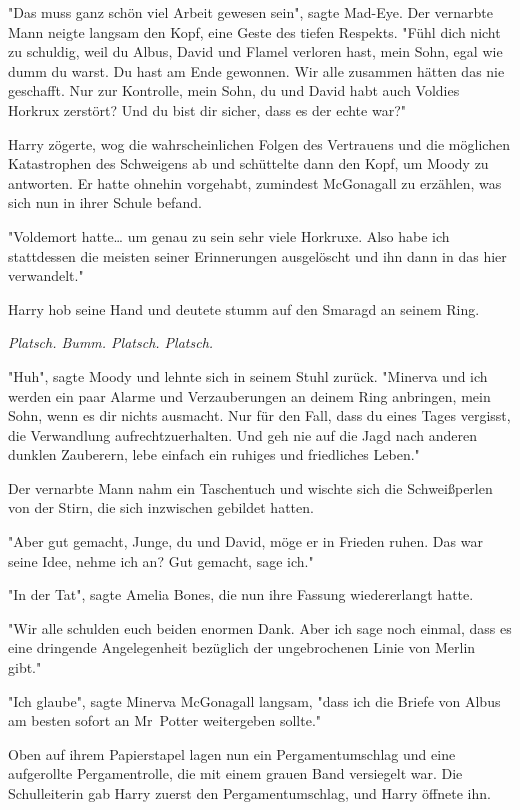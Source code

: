 {"Das muss ganz schön viel Arbeit gewesen sein", sagte Mad-Eye. Der vernarbte Mann neigte langsam den Kopf, eine Geste des tiefen Respekts. "Fühl dich nicht zu schuldig, weil du Albus, David und Flamel verloren hast, mein Sohn, egal wie dumm du warst. Du hast am Ende gewonnen. Wir alle zusammen hätten das nie geschafft. Nur zur Kontrolle, mein Sohn, du und David habt auch Voldies Horkrux zerstört? Und du bist dir sicher, dass es der echte war?"

Harry zögerte, wog die wahrscheinlichen Folgen des Vertrauens und die möglichen Katastrophen des Schweigens ab und schüttelte dann den Kopf, um Moody zu antworten. Er hatte ohnehin vorgehabt, zumindest McGonagall zu erzählen, was sich nun in ihrer Schule befand.

"Voldemort hatte… um genau zu sein sehr viele Horkruxe. Also habe ich stattdessen die meisten seiner Erinnerungen ausgelöscht und ihn dann in das hier verwandelt."

Harry hob seine Hand und deutete stumm auf den Smaragd an seinem Ring.

\emph{Platsch. Bumm. Platsch. Platsch.}

"Huh", sagte Moody und lehnte sich in seinem Stuhl zurück. "Minerva und ich werden ein paar Alarme und Verzauberungen an deinem Ring anbringen, mein Sohn, wenn es dir nichts ausmacht. Nur für den Fall, dass du eines Tages vergisst, die Verwandlung aufrechtzuerhalten. Und geh nie auf die Jagd nach anderen dunklen Zauberern, lebe einfach ein ruhiges und friedliches Leben."

Der vernarbte Mann nahm ein Taschentuch und wischte sich die Schweißperlen von der Stirn, die sich inzwischen gebildet hatten.

"Aber gut gemacht, Junge, du und David, möge er in Frieden ruhen. Das war seine Idee, nehme ich an? Gut gemacht, sage ich."

"In der Tat", sagte Amelia Bones, die nun ihre Fassung wiedererlangt hatte.

"Wir alle schulden euch beiden enormen Dank. Aber ich sage noch einmal, dass es eine dringende Angelegenheit bezüglich der ungebrochenen Linie von Merlin gibt."

"Ich glaube", sagte Minerva McGonagall langsam, "dass ich die Briefe von Albus am besten sofort an Mr~Potter weitergeben sollte."

Oben auf ihrem Papierstapel lagen nun ein Pergamentumschlag und eine aufgerollte Pergamentrolle, die mit einem grauen Band versiegelt war. Die Schulleiterin gab Harry zuerst den Pergamentumschlag, und Harry öffnete ihn.

}
